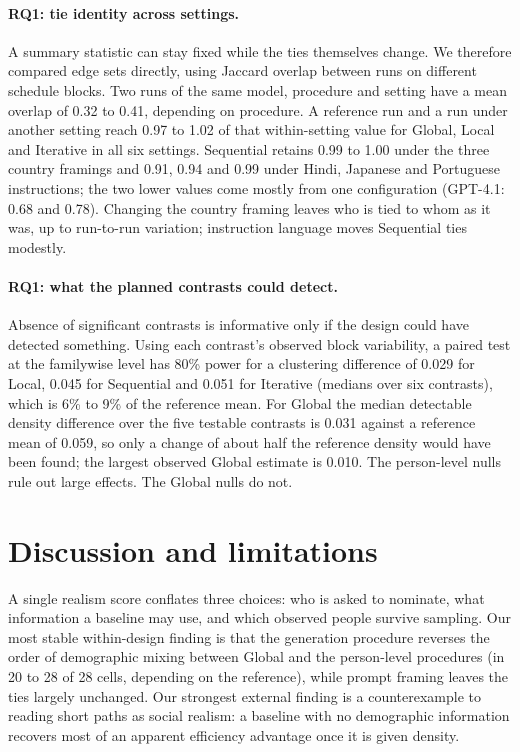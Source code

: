 \documentclass{article}
\begin{document}
\paragraph{RQ1: tie identity across settings.} A summary statistic can stay fixed while the ties themselves change. We therefore compared edge sets directly, using Jaccard overlap between runs on different schedule blocks. Two runs of the same model, procedure and setting have a mean overlap of 0.32 to 0.41, depending on procedure. A reference run and a run under another setting reach 0.97 to 1.02 of that within-setting value for Global, Local and Iterative in all six settings. Sequential retains 0.99 to 1.00 under the three country framings and 0.91, 0.94 and 0.99 under Hindi, Japanese and Portuguese instructions; the two lower values come mostly from one configuration (GPT-4.1: 0.68 and 0.78). Changing the country framing leaves who is tied to whom as it was, up to run-to-run variation; instruction language moves Sequential ties modestly.

\paragraph{RQ1: what the planned contrasts could detect.} Absence of significant contrasts is informative only if the design could have detected something. Using each contrast's observed block variability, a paired test at the familywise level has 80\% power for a clustering difference of 0.029 for Local, 0.045 for Sequential and 0.051 for Iterative (medians over six contrasts), which is 6\% to 9\% of the reference mean. For Global the median detectable density difference over the five testable contrasts is 0.031 against a reference mean of 0.059, so only a change of about half the reference density would have been found; the largest observed Global estimate is 0.010. The person-level nulls rule out large effects. The Global nulls do not.

\section{Discussion and limitations}
A single realism score conflates three choices: who is asked to nominate, what information a baseline may use, and which observed people survive sampling. Our most stable within-design finding is that the generation procedure reverses the order of demographic mixing between Global and the person-level procedures (in 20 to 28 of 28 cells, depending on the reference), while prompt framing leaves the ties largely unchanged. Our strongest external finding is a counterexample to reading short paths as social realism: a baseline with no demographic information recovers most of an apparent efficiency advantage once it is given density.
\end{document}
